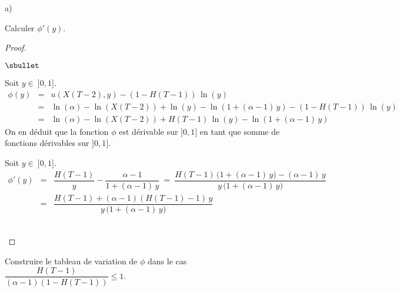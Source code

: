   \begin{noliste}{a)}
    \setcounter{enumi}{6}
    \setlength{\itemsep}{2mm}
    \item Calculer $\phi'(y)$.
    
    \begin{proof}~
      \begin{noliste}{$\sbullet$}
	\item Soit $y \in \ ]0,1]$.
	\[
	  \begin{array}{rcl}
	    \phi(y) &=& u(X(T-2),y) -(1- H(T-1)) \, \ln(y)
	    \\[.2cm]
	    &=& \ln(\alpha) - \ln(X(T-2)) + \ln(y) - 
	    \ln(1+(\alpha -1) \, y) - (1- H(T-1)) \, \ln(y)
	    \\[.2cm]
	    &=& \ln(\alpha) - \ln(X(T-2)) 
	    + H(T-1) \, \ln(y) - \ln(1+(\alpha-1) \,y)
	  \end{array}
	\]
	On en déduit que la fonction $\phi$ est dérivable sur $]0,1]$
	en tant que somme de fonctions dérivables sur $]0,1]$.
	
	\item Soit $y \in \ ]0,1]$.
	\[
	  \begin{array}{rcl}
	    \phi'(y) &=& \dfrac{H(T-1)}{y} - \dfrac{\alpha -1}
	    {1+(\alpha -1) \, y}
	    \ = \ \dfrac{H(T-1) \, \big(1+ (\alpha-1) \, y \big) - 
	    (\alpha -1) \, y}{y \, \big(1+ (\alpha -1) \, y\big)}
	    \\[.6cm]
	    &=& \dfrac{H(T-1) + (\alpha-1) (H(T-1)-1) \, y}
	    {y \, \big(1+ (\alpha -1) \, y\big)}
	  \end{array}
	\]
      \end{noliste}
      \conc{$\forall y \in \ ]0,1]$, $\phi'(y) =
      \dfrac{H(T-1) + (\alpha-1) (H(T-1)-1) \, y}
	    {y \, \big(1+ (\alpha -1) \, y\big)}$}~\\[-1cm]
    \end{proof}
    
    \item Construire le tableau de variation de $\phi$ dans le cas 
    $\dfrac{H(T-1)}{(\alpha-1)(1-H(T-1))} \leq 1$.
    

\end{noliste}
